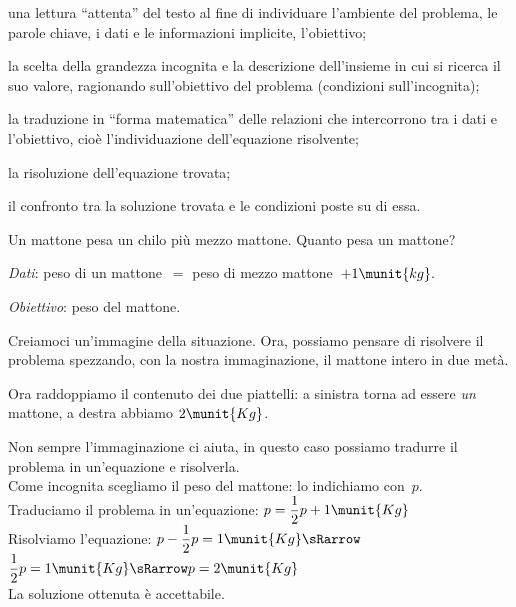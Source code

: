 \begin{enumeratea}
\item una lettura ``attenta'' del
testo al fine di individuare l'ambiente del problema,
le parole chiave, i dati e le informazioni implicite,
l'obiettivo;
\item la scelta della grandezza incognita e la descrizione
dell'insieme in cui si ricerca il suo valore,
ragionando sull'obiettivo del problema (condizioni sull'incognita);
\item la traduzione in ``forma matematica'' delle relazioni che intercorrono 
tra i dati e l'obiettivo, cioè l'individuazione dell'equazione risolvente;
\item la risoluzione dell'equazione trovata;
\item il confronto tra la soluzione trovata e le condizioni poste su di essa.
\end{enumeratea}

\begin{problema}{}{}
Un mattone pesa un chilo più mezzo mattone. Quanto pesa un mattone?
\end{problema}

\begin{soluzione}{}{}
\emph{Dati}: peso di un mattone~\(=\) peso di mezzo 
mattone~\(+ 1\munit{kg}.\)

\emph{Obiettivo}: peso del mattone.

Creiamoci un'immagine della situazione.
Ora, possiamo pensare di risolvere il problema spezzando, con la nostra 
immaginazione, il mattone intero in due metà.


Ora raddoppiamo il contenuto dei due piattelli: a sinistra torna ad essere 
\emph{un} mattone, a destra abbiamo \(2\munit{Kg}\).

Non sempre l'immaginazione ci aiuta, in questo caso possiamo tradurre il 
problema in un'equazione e risolverla.\\
Come incognita scegliamo il peso del mattone: lo indichiamo con~\(p\).\\
Traduciamo il problema in un'equazione: \quad 
\(p=\dfrac{1}{2}p+1\munit{Kg}\)\\
Risolviamo l'equazione: \quad 
\(p-\dfrac{1}{2}p=1\munit{Kg} \sRarrow \) 
\(\dfrac{1}{2}p=1\munit{Kg} \sRarrow p=2\munit{Kg}\)\\
La soluzione ottenuta è accettabile.
\end{soluzione}

